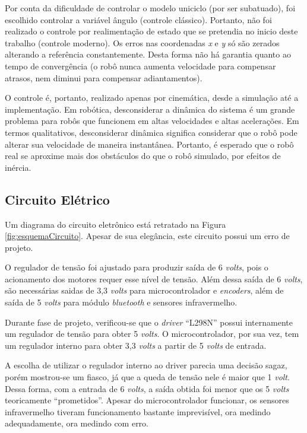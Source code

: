 	Por conta da dificuldade de controlar o modelo uniciclo (por ser subatuado), foi escolhido
	controlar a variável ângulo (controle clássico). Portanto, não foi realizado o controle 
	por realimentação de estado que se pretendia no inicio deste trabalho (controle moderno).
	Os erros nas coordenadas \textit{x} e \textit{y} só são zerados alterando a referência
	constantemente. Desta forma não há garantia quanto ao tempo de convergência (o
	robô nunca aumenta velocidade para compensar atrasos, nem diminui para compensar 
	adiantamentos). 
	
	O controle é, portanto, realizado apenas por cinemática, desde a simulação até a
	implementação. Em robótica, desconsiderar a dinâmica do sistema é um grande problema
	para robôs que funcionem em altas velocidades e altas acelerações. Em termos qualitativos,
	desconsiderar dinâmica significa considerar que o robô pode alterar sua velocidade de 
	maneira instantânea. Portanto, é esperado que o robô real se aproxime mais dos
	obstáculos do que o robô simulado, por efeitos de inércia. 

	\subsection{Circuito Elétrico}
	
	Um diagrama do circuito eletrônico está retratado na Figura \ref{fig:esquemaCircuito}. 
	Apesar de sua elegância, este circuito possui um erro de projeto.
	
	
	
	O regulador de tensão foi ajustado para produzir saída de 6 \textit{volts}, pois o 
	acionamento dos motores requer esse nível de tensão. Além dessa saída de 6 \textit{volts}, 
	são necessárias saidas de 3,3 \textit{volts} para microcontrolador e \textit{encoders}, 
	além de saída de 5 \textit{volts} para módulo \textit{bluetooth} e sensores infravermelho. 
	
	Durante fase de projeto, verificou-se que o \textit{driver} ``L298N'' possui internamente 
	um regulador de tensão para obter 5 \textit{volts}. O microcontrolador, por sua vez, tem 
	um regulador interno para obter 3,3 \textit{volts} a partir de 5 \textit{volts} de entrada. 
	
	A escolha de utilizar o regulador interno ao driver parecia uma decisão sagaz, porém
	mostrou-se um fiasco, já que a queda de tensão nele é maior que 1 \textit{volt}. Dessa 
	forma, com a entrada de 6 \textit{volts}, a saída obtida foi menor que os 5 \textit{volts} 
	teoricamente ``prometidos''. Apesar do microcontrolador funcionar, os sensores 
	infravermelho tiveram funcionamento bastante imprevisível, ora medindo adequadamente, 
	ora medindo com erro. 
	
